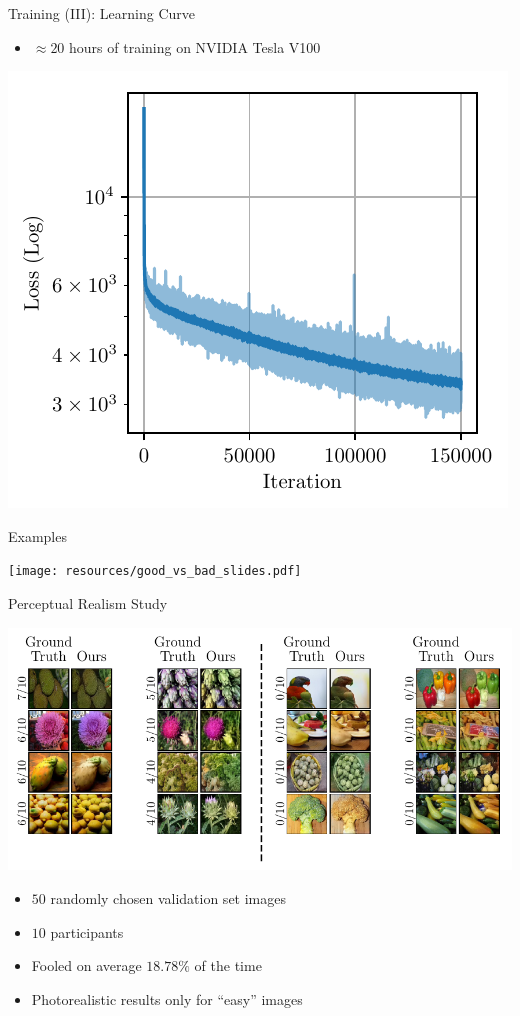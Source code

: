 \documentclass{beamer}
\begin{document}
\begin{frame}{Training (III): Learning Curve}
  \begin{itemize}
    \item $\approx 20$ hours of training on NVIDIA Tesla V100
  \end{itemize}

  \begin{center}
    \includegraphics[width=.6\textwidth]{resources/learning_curve.pdf}
  \end{center}
\end{frame}

\begin{frame}{Examples}
  \begin{center}
    \texttt{[image: resources/good\_vs\_bad\_slides.pdf]}
  \end{center}
\end{frame}

\begin{frame}{Perceptual Realism Study}
  \begin{center}
    \includegraphics[width=\textwidth]{resources/amt_results_slides.pdf}
  \end{center}

  \begin{itemize}
    \item $50$ randomly chosen validation set images
    \item $10$ participants
    \item Fooled on average $18.78\%$ of the time
    \item Photorealistic results only for ``easy'' images
  \end{itemize}
\end{frame}
\end{document}
